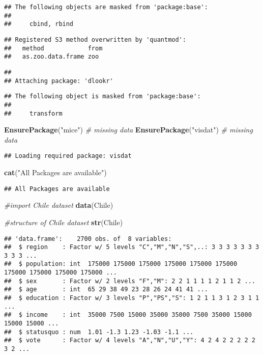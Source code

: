 \documentclass[]{article}
\newenvironment{Shaded}{\begin{snugshade}}{\end{snugshade}}
\newcommand{\CommentTok}[1]{\textcolor[rgb]{0.56,0.35,0.01}{\textit{#1}}}
\newcommand{\KeywordTok}[1]{\textcolor[rgb]{0.13,0.29,0.53}{\textbf{#1}}}
\newcommand{\NormalTok}[1]{#1}
\newcommand{\StringTok}[1]{\textcolor[rgb]{0.31,0.60,0.02}{#1}}
\begin{document}
\begin{verbatim}
## The following objects are masked from 'package:base':
## 
##     cbind, rbind
\end{verbatim}

\begin{verbatim}
## Registered S3 method overwritten by 'quantmod':
##   method            from
##   as.zoo.data.frame zoo
\end{verbatim}

\begin{verbatim}
## 
## Attaching package: 'dlookr'
\end{verbatim}

\begin{verbatim}
## The following object is masked from 'package:base':
## 
##     transform
\end{verbatim}

\begin{Shaded}
\begin{Highlighting}[]
\KeywordTok{EnsurePackage}\NormalTok{(}\StringTok{"mice"}\NormalTok{) }\CommentTok{# missing data }
\KeywordTok{EnsurePackage}\NormalTok{(}\StringTok{"visdat"}\NormalTok{) }\CommentTok{# missing data }
\end{Highlighting}
\end{Shaded}

\begin{verbatim}
## Loading required package: visdat
\end{verbatim}

\begin{Shaded}
\begin{Highlighting}[]
\KeywordTok{cat}\NormalTok{(}\StringTok{"All Packages are available"}\NormalTok{)}
\end{Highlighting}
\end{Shaded}

\begin{verbatim}
## All Packages are available
\end{verbatim}

\begin{Shaded}
\begin{Highlighting}[]
\CommentTok{#import Chile dataset}
\KeywordTok{data}\NormalTok{(Chile)}

\CommentTok{#structure of Chile dataset}
\KeywordTok{str}\NormalTok{(Chile)}
\end{Highlighting}
\end{Shaded}

\begin{verbatim}
## 'data.frame':    2700 obs. of  8 variables:
##  $ region    : Factor w/ 5 levels "C","M","N","S",..: 3 3 3 3 3 3 3 3 3 3 ...
##  $ population: int  175000 175000 175000 175000 175000 175000 175000 175000 175000 175000 ...
##  $ sex       : Factor w/ 2 levels "F","M": 2 2 1 1 1 1 2 1 1 2 ...
##  $ age       : int  65 29 38 49 23 28 26 24 41 41 ...
##  $ education : Factor w/ 3 levels "P","PS","S": 1 2 1 1 3 1 2 3 1 1 ...
##  $ income    : int  35000 7500 15000 35000 35000 7500 35000 15000 15000 15000 ...
##  $ statusquo : num  1.01 -1.3 1.23 -1.03 -1.1 ...
##  $ vote      : Factor w/ 4 levels "A","N","U","Y": 4 2 4 2 2 2 2 2 3 2 ...
\end{verbatim}
\end{document}
